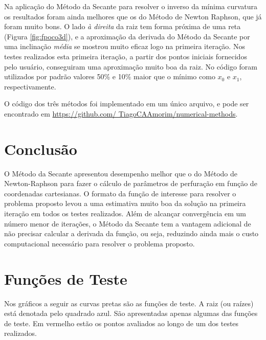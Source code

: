 \documentclass[final,5p]{elsarticle}
\numberwithin{equation}{section}
\begin{document}
    Na aplicação do Método da Secante para resolver o inverso da mínima curvatura os resultados foram ainda melhores que os do Método de Newton Raphson, que já foram muito bons. O lado \emph{à direita} da raiz tem forma próxima de uma reta (Figura \ref{fig:fpoco3d}), e a aproximação da derivada do Método da Secante por uma inclinação \emph{média} se mostrou muito eficaz logo na primeira iteração. Nos testes realizados esta primeira iteração, a partir dos pontos iniciais fornecidos pelo usuário, conseguiram uma aproximação muito boa da raiz.
    No código foram utilizados por padrão valores 50\% e 10\% maior que o mínimo como $x_0$ e $x_1$, respectivamente. 

    O código dos três métodos foi implementado em um único arquivo, e pode ser encontrado em \href{https://github.com/TiagoCAAmorim/numerical-methods/blob/main/03_Secante/03_secante.c}{https://github.com/ TiagoCAAmorim/numerical-methods}.

    \section{Conclusão}
    
    O Método da Secante apresentou desempenho melhor que o do Método de Newton-Raphson para fazer o cálculo de parâmetros de perfuração em função de coordenadas cartesianas. O formato da função de interesse para resolver o problema proposto levou a uma estimativa muito boa da solução na primeira iteração em todos os testes realizados. Além de alcançar convergência em um número menor de iterações, o Método da Secante tem a vantagem adicional de não precisar calcular a derivada da função, ou seja, reduzindo ainda mais o custo computacional necessário para resolver o problema proposto.

    

\appendix

\section{Funções de Teste}

Nos gráficos a seguir as curvas pretas são as funções de teste. A raiz (ou raízes) está denotada pelo quadrado azul. São apresentadas apenas algumas das funções de teste. Em vermelho estão os pontos avaliados ao longo de um dos testes realizados.
\end{document}

